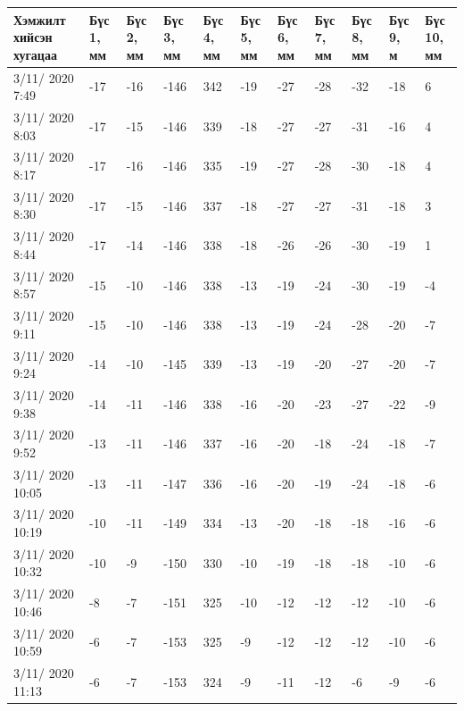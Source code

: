 \begin{table}[h]
    \centering
    \begin{tabular}{|p{1.5cm}|p{0.8cm}|p{0.8cm}|p{0.8cm}|p{0.8cm}|p{0.8cm}|p{0.8cm}|p{0.8cm}|p{0.8cm}|p{0.8cm}|p{0.8cm}|}
         \hline
     Хэмжилт хийсэн хугацаа & Бүс 1, мм&	Бүс 2, мм&	Бүс 3, мм&	Бүс 4, мм&	Бүс 5, мм&	Бүс 6, мм&	Бүс 7, мм&	Бүс 8, мм&	Бүс 9, м&	Бүс 10, мм \\ \hline
3/11/ 2020 7:49&	-17&	-16&-146&342&-19&	-27&	-28&-32&-18&	6 \\ \hline
3/11/ 2020 8:03&	-17&	-15&-146&339&-18&	-27&	-27&-31&-16&	4 \\ \hline
3/11/ 2020 8:17&	-17&	-16&-146&335&-19&	-27&	-28&-30&-18&	4 \\ \hline
3/11/ 2020 8:30&	-17&	-15&-146&337&-18&	-27&	-27&-31&-18&	3 \\ \hline
3/11/ 2020 8:44&	-17&	-14&-146&338&-18&	-26&	-26&-30&-19&	1 \\ \hline
3/11/ 2020 8:57&	-15&	-10&-146&338&-13&	-19&	-24&-30&-19&	-4 \\ \hline
3/11/ 2020 9:11&	-15&	-10&-146&338&-13&	-19&	-24&-28&-20&	-7 \\ \hline
3/11/ 2020 9:24&	-14&	-10&-145&339&-13&	-19&	-20&-27&-20&	-7 \\ \hline
3/11/ 2020 9:38&	-14&	-11&-146&338&-16&	-20&	-23&-27&-22&	-9 \\ \hline
3/11/ 2020 9:52&	-13&	-11&-146&337&-16&	-20&	-18&-24&-18&	-7 \\ \hline
3/11/ 2020 10:05&	-13&	-11&-147&336&-16&	-20&	-19&-24&-18&	-6 \\ \hline
3/11/ 2020 10:19&	-10&	-11&-149&334&-13&	-20&	-18&-18&-16&	-6 \\ \hline
3/11/ 2020 10:32&	-10&	-9&	-150&330&-10&	-19&	-18&-18&-10&	-6 \\ \hline
3/11/ 2020 10:46&	-8&	    -7&	-151&325&-10&	-12&	-12&-12&-10&	-6 \\ \hline
3/11/ 2020 10:59&	-6&	    -7&	-153&325&-9&	-12&	-12&-12&-10&	-6 \\ \hline
3/11/ 2020 11:13&	-6& 	-7&	-153&324&-9&	-11&	-12&-6&	-9& 	-6 \\ \hline
    \end{tabular}
\end{table}
